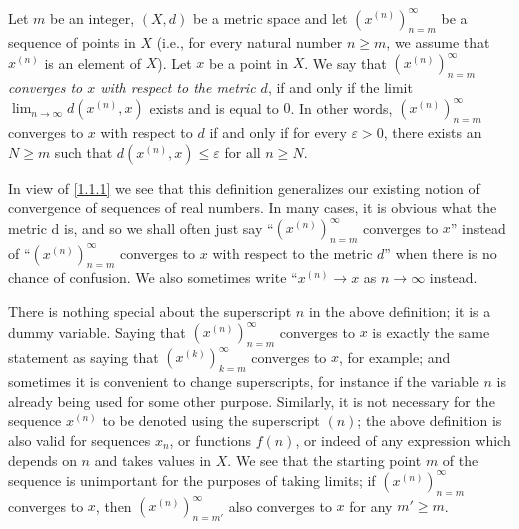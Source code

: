 \setcounter{thm}{13}
\begin{defn}\label{1.1.14}
  Let \(m\) be an integer, \((X, d)\) be a metric space and let \((x^{(n)})_{n = m}^\infty\) be a sequence of points in \(X\)
  (i.e., for every natural number \(n \geq m\), we assume that \(x^{(n)}\) is an element of \(X\)).
  Let \(x\) be a point in \(X\).
  We say that \emph{\((x^{(n)})_{n = m}^\infty\) converges to \(x\) with respect to the metric \(d\)}, if and only if the limit \(\lim_{n \to \infty} d(x^{(n)}, x)\) exists and is equal to \(0\).
  In other words, \((x^{(n)})_{n = m}^\infty\) converges to \(x\) with respect to \(d\) if and only if for every \(\varepsilon > 0\), there exists an \(N \geq m\) such that \(d(x^{(n)}, x) \leq \varepsilon\) for all \(n \geq N\).
\end{defn}

\begin{rmk}\label{1.1.15}
  In view of \cref{1.1.1} we see that this definition generalizes our existing notion of convergence of sequences of real numbers.
  In many cases, it is obvious what the metric d is, and so we shall often just say ``\((x^{(n)})_{n = m}^\infty\) converges to \(x\)'' instead of ``\((x^{(n)})_{n = m}^\infty\) converges to \(x\) with respect to the metric \(d\)'' when there is no chance of confusion.
  We also sometimes write ``\(x^{(n)} \to x\) as \(n \to \infty\) instead.
\end{rmk}

\begin{rmk}\label{1.1.16}
  There is nothing special about the superscript \(n\) in the above definition;
  it is a dummy variable.
  Saying that \((x^{(n)})_{n = m}^\infty\) converges to \(x\) is exactly the same statement as saying that \((x^{(k)})_{k = m}^\infty\) converges to \(x\), for example;
  and sometimes it is convenient to change superscripts, for instance if the variable \(n\) is already being used for some other purpose.
  Similarly, it is not necessary for the sequence \(x^{(n)}\) to be denoted using the superscript \((n)\);
  the above definition is also valid for sequences \(x_n\), or functions \(f(n)\), or indeed of any expression which depends on \(n\) and takes values in \(X\).
  We see that the starting point \(m\) of the sequence is unimportant for the purposes of taking limits;
  if \((x^{(n)})_{n = m}^\infty\) converges to \(x\), then \((x^{(n)})_{n = m'}^\infty\) also converges to \(x\) for any \(m' \geq m\).
\end{rmk}

